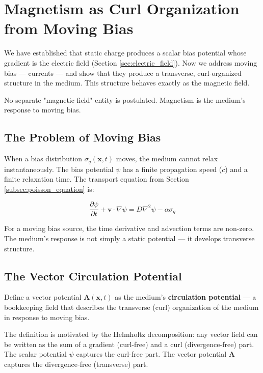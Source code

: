 \documentclass[12pt, a4paper]{article}
\begin{document}
\section{Magnetism as Curl Organization from Moving Bias}
\label{sec:magnetism_curl}

We have established that static charge produces a scalar bias potential whose gradient is the electric field (Section \ref{sec:electric_field}). Now we address moving bias — currents — and show that they produce a transverse, curl-organized structure in the medium. This structure behaves exactly as the magnetic field.

No separate "magnetic field" entity is postulated. Magnetism is the medium's response to moving bias.

\subsection{The Problem of Moving Bias}
\label{subsec:moving_bias}

When a bias distribution \( \sigma_q(\mathbf{x}, t) \) moves, the medium cannot relax instantaneously. The bias potential \( \psi \) has a finite propagation speed (\( c \)) and a finite relaxation time. The transport equation from Section \ref{subsec:poisson_equation} is:

\[
\frac{\partial \psi}{\partial t} + \mathbf{v} \cdot \nabla \psi = D \nabla^2 \psi - \alpha \sigma_q
\]

For a moving bias source, the time derivative and advection terms are non-zero. The medium's response is not simply a static potential — it develops transverse structure.

\subsection{The Vector Circulation Potential}
\label{subsec:vector_potential}

Define a vector potential \( \mathbf{A}(\mathbf{x}, t) \) as the medium's \textbf{circulation potential} — a bookkeeping field that describes the transverse (curl) organization of the medium in response to moving bias.

The definition is motivated by the Helmholtz decomposition: any vector field can be written as the sum of a gradient (curl-free) and a curl (divergence-free) part. The scalar potential \( \psi \) captures the curl-free part. The vector potential \( \mathbf{A} \) captures the divergence-free (transverse) part.
\end{document}
